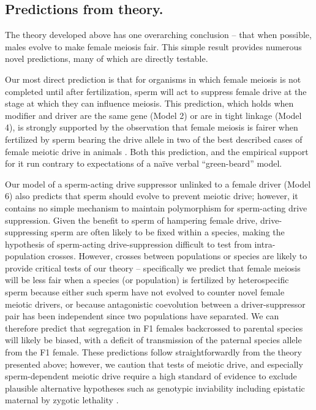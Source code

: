\documentclass[12pt,letterpaper]{article}
\newcommand{\yb}[1]{{ \color{blue} #1}}
\begin{document}
\subsection*{Predictions from theory.} 

\yb{The theory developed above has one overarching conclusion -- that when possible, males evolve to make female meiosis fair. 
This simple result provides numerous novel predictions, many of which are directly testable. 

Our most direct prediction is that for organisms in which female  meiosis is not completed until after fertilization, 
	sperm will act to suppress female drive at the stage at which they can influence meiosis. 
This prediction, which holds when modifier and driver are the same gene (Model 2) or are in tight linkage (Model 4),  
	is strongly supported by the observation that female meiosis 
	is fairer when fertilized by sperm bearing the drive allele in 
	two of the best described cases of female meiotic drive in 
	animals \citep[the \emph{Om} and \emph{In} loci in mice, ][]{Agulnik1993,Wu2005}.  
Both this prediction, and the empirical support for it run contrary to expectations of a na\"{i}ve verbal ``green-beard'' model. 
}

\yb{Our model of a sperm-acting drive suppressor unlinked to a female driver (Model 6) also predicts that sperm should evolve to prevent meiotic drive; 
	however, it contains no simple mechanism to maintain polymorphism for sperm-acting drive suppression.
Given the benefit to sperm of hampering female drive, 
	drive-suppressing sperm are often likely to be fixed within a species, 
	making the hypothesis of sperm-acting drive-suppression difficult to test from intra-population crosses. 
However, crosses between populations or species are likely to provide critical tests of our theory -- 
	specifically we predict that female meiosis will be less fair when a species (or population) is 
	fertilized by heterospecific sperm because either such sperm have not evolved to counter novel female meiotic drivers, 
	or because antagonistic coevolution between a driver-suppressor pair has been independent since two populations have separated. 
We can therefore predict that segregation in F1 females backcrossed to parental species will likely be biased, 
	with a deficit of transmission of the paternal species allele from the F1  female.   
These predictions follow straightforwardly from the
	theory presented above; however, we caution that tests of meiotic drive, 
	and especially sperm-dependent meiotic drive require a high standard
	of evidence  to exclude plausible alternative hypotheses such as genotypic 
	inviability including epistatic maternal by zygotic lethality \citep[e.g. ][]{Sawamura:1993aa}.  \newline
}
\end{document}
